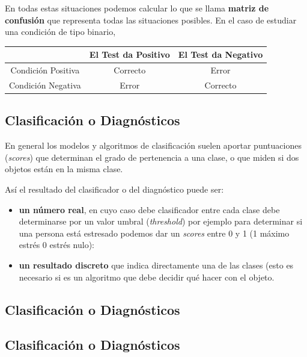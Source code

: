 \documentclass[]{book}
\providecommand{\tightlist}{%
  \setlength{\itemsep}{0pt}\setlength{\parskip}{0pt}}
\begin{document}
En todas estas situaciones podemos calcular lo que se llama \textbf{matriz de confusión} que representa todas las situaciones posibles. En el caso de estudiar una condición de tipo binario,

\begin{longtable}[]{@{}ccc@{}}
\toprule
& El Test da Positivo & El Test da Negativo\tabularnewline
\midrule
\endhead
Condición Positiva & Correcto & Error\tabularnewline
Condición Negativa & Error & Correcto\tabularnewline
\bottomrule
\end{longtable}

\hypertarget{clasificaciuxf3n-o-diagnuxf3sticos-2}{%
\subsection{Clasificación o Diagnósticos}\label{clasificaciuxf3n-o-diagnuxf3sticos-2}}

En general los modelos y algoritmos de clasificación suelen aportar puntuaciones (\emph{scores}) que determinan el grado de pertenencia a una clase, o que miden si dos objetos están en la misma clase.

Así el resultado del clasificador o del diagnóstico puede ser:

\begin{itemize}
\tightlist
\item
  \textbf{un número real}, en cuyo caso debe clasificador entre cada clase debe determinarse por un valor umbral (\emph{threshold}) por ejemplo para determinar si una persona está estresado podemos dar un \emph{scores} entre 0 y 1 (1 máximo estrés 0 estrés nulo):
\item
  \textbf{un resultado discreto} que indica directamente una de las clases (esto es necesario si es un algoritmo que debe decidir qué hacer con el objeto.
\end{itemize}

\hypertarget{clasificaciuxf3n-o-diagnuxf3sticos-3}{%
\subsection{Clasificación o Diagnósticos}\label{clasificaciuxf3n-o-diagnuxf3sticos-3}}

\hypertarget{clasificaciuxf3n-o-diagnuxf3sticos-4}{%
\subsection{Clasificación o Diagnósticos}\label{clasificaciuxf3n-o-diagnuxf3sticos-4}}
\end{document}

